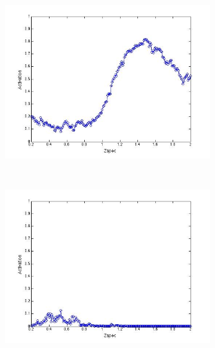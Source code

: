 \documentclass[useAMS,usenatbib,fleqn]{mn2e}
\begin{document}
\begin{figure}
\begin{subfigure}[b]{0.075\textwidth}
                \includegraphics[trim = 35px 15px 50px 25px, clip=true,width=\textwidth]{figures/activation_05.jpg}
        \end{subfigure}
        ~
        \begin{subfigure}[b]{0.075\textwidth}
                \includegraphics[trim = 35px 15px 50px 25px, clip=true,width=\textwidth]{figures/activation_06.jpg}
        \end{subfigure}
        ~
        \begin{subfigure}[b]{0.075\textwidth}

\end{subfigure}
\end{figure}
\end{document}
